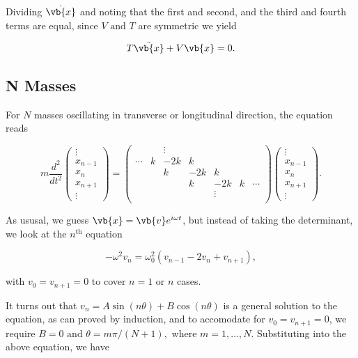 \documentclass[a4paper,12pt]{report}
\begin{document}
Dividing \(\dot{\vb{x} } \) and noting that the first and second, and the third and fourth terms are equal, since \(V \text { and } T\) are symmetric we yield 

\begin{equation}
	T \ddot{\vb{x} } + V \vb{x} = 0.
\end{equation}




\subsection{N Masses}

For \(N\) masses oscillating in transverse or longitudinal direction, the equation reads 

\begin{equation}
	m \frac{d^2}{dt^2} 
\begin{pmatrix}
\vdots \\
x_{n-1} \\
x_n \\
x_{n+1} \\
\vdots
\end{pmatrix}
=
\begin{pmatrix}
	 &  & \vdots  &  &  &  &   \\
	\cdots  & k & -2k & k &  &  &   \\
	 &  & k & -2k & k &  &   \\
	 &  &  & k & -2k & k &  \cdots  \\
	 &  &  &  & \vdots  &  &   \\
\end{pmatrix}
\begin{pmatrix}
\vdots \\
x_{n-1} \\
x_n \\
x_{n+1} \\
\vdots
\end{pmatrix}.
\end{equation}

As ususal, we guess \(\vb{x} = \vb{v} e^{i \omega t} \), but instead of taking the determinant, we look at the \(n^{\text{th}} \) equation

\begin{equation}
	-\omega ^2 v_{n} = \omega _{0}^2(v_{n-1} -2v_{n} +v_{n+1} ),
\end{equation}

with \(v_{0} = v_{n+1} =0 \) to cover \(n=1 \text { or } n\) cases.  

It turns out that \(v_{n} = A \sin (n \theta ) + B\cos (n \theta ) \) is a general solution to the equation, as can proved by induction, and to accomodate for \(v_{0} = v_{n+1} = 0  \), we require \(B = 0 \text { and }  \theta = m\pi /(N+1), \text{ where } m = 1,\ldots , N \). Substituting into the above equation, we have
\end{document}
